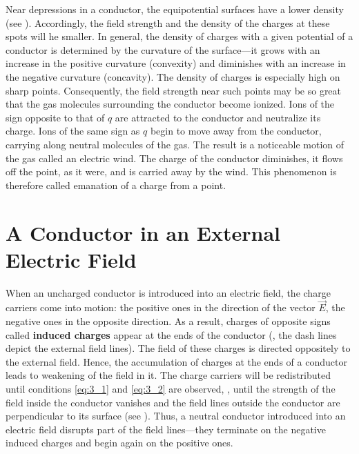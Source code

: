 Near depressions in a conductor, the equipotential surfaces have a lower density (see ). Accordingly,
the field strength and the density of the charges at these spots will he smaller. In general, the density of charges with a given potential of a conductor is determined by the curvature of the surface---it grows with an increase in the positive curvature (convexity) and diminishes with an increase in the negative curvature (concavity). The density of charges is especially high on sharp points. Consequently, the field strength near such points may be so great that the gas molecules surrounding the conductor become ionized. Ions of the sign opposite to that of $q$ are attracted to the conductor and neutralize its charge. Ions of the same sign as $q$ begin to move away from the conductor, carrying along neutral molecules of the gas. The result is a noticeable motion of the gas called an electric wind. The charge of the conductor diminishes, it flows off the point, as it were, and is carried away by the wind. This phenomenon is therefore called emanation of a charge from a point.

\section{A Conductor in an External Electric Field}\label{sec:3_2}

When an uncharged conductor is introduced into an electric field, the charge carriers come into motion: the positive ones in the direction of the vector $\vec{E}$, the negative ones in the opposite direction. As a result, charges of opposite signs called \textbf{induced charges} appear at the ends of the conductor (, the dash lines depict the external field lines). The field of these charges is directed oppositely to the external field. Hence, the accumulation of charges at the ends of a conductor leads to weakening of the field in it. The charge carriers will be redistributed until conditions \eqref{eq:3_1} and \eqref{eq:3_2} are observed, \ie, until the strength of the field inside the conductor vanishes and the field lines outside the conductor are perpendicular to its surface (see ). Thus, a neutral conductor introduced into an electric field disrupts part of the field lines---they terminate on the negative induced charges and begin again on the positive ones.

